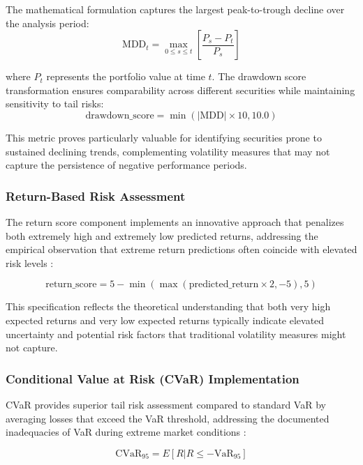 \documentclass[3p,times,procedia]{elsarticle}
\begin{document}
The mathematical formulation captures the largest peak-to-trough decline over the analysis period:
\begin{equation}
\text{MDD}_t = \max_{0 \leq s \leq t} \left[ \frac{P_s - P_t}{P_s} \right]
\end{equation}

where $P_t$ represents the portfolio value at time $t$. The drawdown score transformation ensures comparability across different securities while maintaining sensitivity to tail risks:
\begin{equation}
\text{drawdown\_score} = \min(|\text{MDD}| \times 10, 10.0)
\end{equation}

This metric proves particularly valuable for identifying securities prone to sustained declining trends, complementing volatility measures that may not capture the persistence of negative performance periods.

\subsubsection{{Return-Based Risk Assessment}}

The return score component implements an innovative approach that penalizes both extremely high and extremely low predicted returns, addressing the empirical observation that extreme return predictions often coincide with elevated risk levels \cite{Harvey2016}:

\begin{equation}
\text{return\_score} = 5 - \min(\max(\text{predicted\_return} \times 2, -5), 5)
\end{equation}

This specification reflects the theoretical understanding that both very high expected returns and very low expected returns typically indicate elevated uncertainty and potential risk factors that traditional volatility measures might not capture.

\subsubsection{{Conditional Value at Risk (CVaR) Implementation}}

CVaR provides superior tail risk assessment compared to standard VaR by averaging losses that exceed the VaR threshold, addressing the documented inadequacies of VaR during extreme market conditions \cite{Rockafellar2000}:

\begin{equation}
\text{CVaR}_{95} = E[R | R \leq -\text{VaR}_{95}]
\end{equation}
\end{document}
